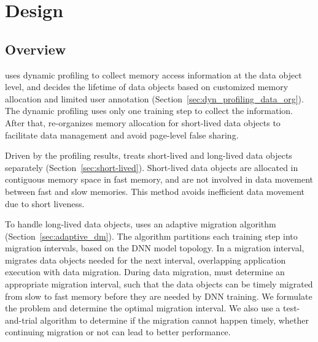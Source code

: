 \section{Design}
\subsection{Overview}

\textcolor{check}{\name uses dynamic profiling to }collect memory access information at the data object level, and decides the lifetime of data objects based on customized memory allocation and limited user annotation (Section~\ref{sec:dyn_profiling_data_org}). The dynamic profiling uses only one training step to collect the information. After that, \name re-organizes memory allocation for short-lived data objects to facilitate data management and avoid page-level false sharing.

Driven by the profiling results, \name treats short-lived and long-lived data objects separately (Section~\ref{sec:short-lived}). Short-lived data objects are allocated in contiguous memory space in fast memory, and are not involved in data movement between fast and slow memories. This method avoids inefficient data movement due to short liveness. 

To handle long-lived data objects, \name uses an adaptive migration algorithm  (Section~\ref{sec:adaptive_dm}). The algorithm partitions each training step into migration intervals, based on the DNN model topology. In a migration interval, \name migrates data objects needed for the next interval, overlapping application execution with data migration. During data migration, \name must determine an appropriate migration interval, such that the data objects can be timely migrated from slow to fast memory before they are needed by DNN training. We formulate the problem and determine the optimal migration interval. We also use a test-and-trial algorithm to determine if the migration cannot happen timely, whether continuing migration or not can lead to better performance. 


